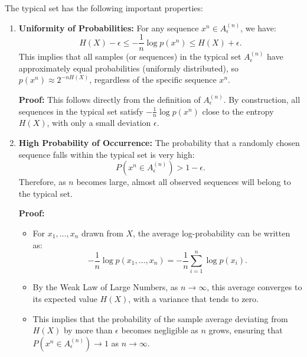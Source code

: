 The typical set has the following important properties:
\begin{enumerate}
    \item \textbf{Uniformity of Probabilities:} For any sequence $x^n \in A^{(n)}_\epsilon$, we have:
          \[
              H(X) - \epsilon \leq -\frac{1}{n} \log p(x^n) \leq H(X) + \epsilon.
          \]
          This implies that all samples (or sequences) in the typical set $A_\epsilon^{(n)}$ have approximately equal probabilities (uniformly distributed), so $p(x^n) \approx 2^{-nH(X)}$, regardless of the specific sequence $x^n$.

          \textbf{Proof:} This follows directly from the definition of $A^{(n)}_\epsilon$. By construction, all sequences in the typical set satisfy $-\frac{1}{n} \log p(x^n)$ close to the entropy $H(X)$, with only a small deviation $\epsilon$.

    \item \textbf{High Probability of Occurrence:} The probability that a randomly chosen sequence falls within the typical set is very high:
          \[
              P(x^n \in A^{(n)}_\epsilon) > 1 - \epsilon.
          \]
          Therefore, as $n$ becomes large, almost all observed sequences will belong to the typical set.

          \textbf{Proof:}
          \begin{itemize}
              \item For $x_1, \dots, x_n$ drawn from $X$, the average log-probability can be written as:
                    \[
                        -\frac{1}{n} \log p(x_1, \dots, x_n) = -\frac{1}{n} \sum_{i=1}^n \log p(x_i).
                    \]
              \item By the Weak Law of Large Numbers, as $n \to \infty$, this average converges to its expected value $H(X)$, with a variance that tends to zero.
              \item This implies that the probability of the sample average deviating from $H(X)$ by more than $\epsilon$ becomes negligible as $n$ grows, ensuring that $P(x^n \in A^{(n)}_\epsilon) \to 1$ as $n \to \infty$.
          \end{itemize}


\end{enumerate}
